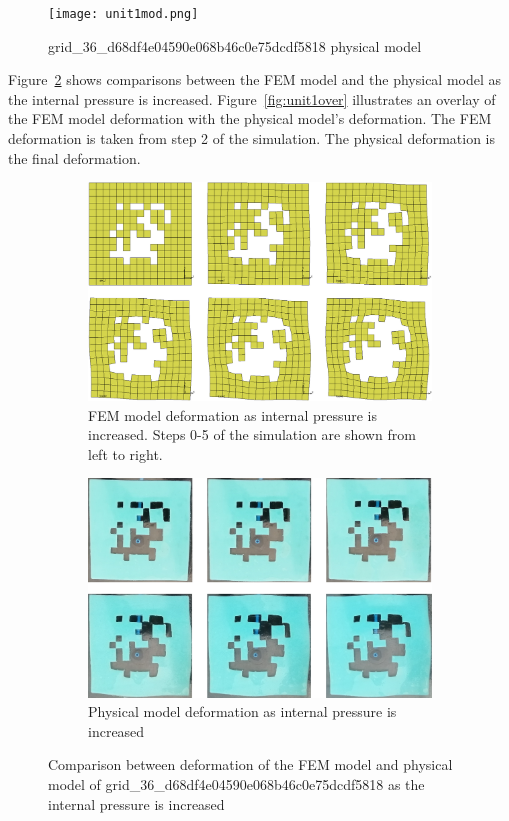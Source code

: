 \begin{figure}[H]
	\centering
	\texttt{[image: unit1mod.png]}
	\caption[Physical validation model of unit 1]{grid\_36\_d68df4e04590e068b46c0e75dcdf5818 physical model}
	\label{fig:unit1mod}
\end{figure}

Figure~\ref{fig:unit1def} shows comparisons between the FEM model and the physical model as the internal pressure is increased. Figure~\ref{fig:unit1over} illustrates an overlay of the FEM model deformation with the physical model's deformation. The FEM deformation is taken from step 2 of the simulation. The physical deformation is the final deformation.

\begin{figure}[H]
	\centering
	\begin{subfigure}[c]{\textwidth}
		\centering
		\includegraphics[width=\textwidth]{unit1deffem.png}
		\caption{FEM model deformation as internal pressure is increased. Steps 0-5 of the simulation are shown from left to right.}
	\end{subfigure}
	\hfill
	\begin{subfigure}[c]{\textwidth}
		\centering
		\includegraphics[width=\textwidth]{unit1defmod.png}
		\caption{Physical model deformation as internal pressure is increased}
	\end{subfigure}
	\caption[Comparison between FEM and physical models of unit 1]{Comparison between deformation of the FEM model and physical model of grid\_36\_d68df4e04590e068b46c0e75dcdf5818 as the internal pressure is increased}
	\label{fig:unit1def}
\end{figure}

